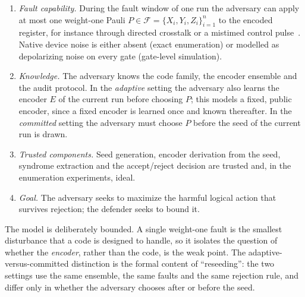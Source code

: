 \begin{assumption}\label{ass:qec:model}
\begin{enumerate}
  \item \emph{Fault capability.} During the fault window of one run the adversary can apply at most one weight-one Pauli $P\in\mathcal{F}=\{X_i,Y_i,Z_i\}_{i=1}^{n}$ to the encoded register, for instance through directed crosstalk or a mistimed control pulse~\cite{ashsaki2020crosstalk}. Native device noise is either absent (exact enumeration) or modelled as depolarizing noise on every gate (gate-level simulation).
  \item \emph{Knowledge.} The adversary knows the code family, the encoder ensemble and the audit protocol. In the \emph{adaptive} setting the adversary also learns the encoder $E$ of the current run before choosing $P$; this models a fixed, public encoder, since a fixed encoder is learned once and known thereafter. In the \emph{committed} setting the adversary must choose $P$ before the seed of the current run is drawn.
  \item \emph{Trusted components.} Seed generation, encoder derivation from the seed, syndrome extraction and the accept/reject decision are trusted and, in the enumeration experiments, ideal.
  \item \emph{Goal.} The adversary seeks to maximize the harmful logical action that survives rejection; the defender seeks to bound it.
\end{enumerate}
\end{assumption}

The model is deliberately bounded. A single weight-one fault is the smallest disturbance that a code is designed to handle, so it isolates the question of whether the \emph{encoder}, rather than the code, is the weak point. The adaptive-versus-committed distinction is the formal content of ``reseeding'': the two settings use the same ensemble, the same faults and the same rejection rule, and differ only in whether the adversary chooses after or before the seed.

